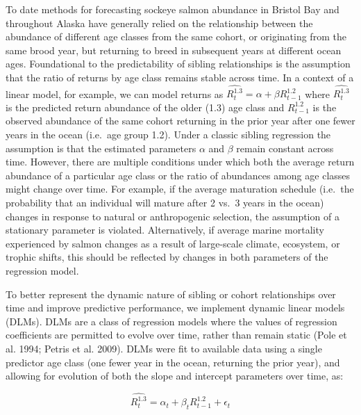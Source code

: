 \documentclass[
]{article}
\begin{document}
To date methods for forecasting sockeye salmon abundance in Bristol Bay and throughout Alaska have generally relied on the relationship between the abundance of different age classes from the same cohort, or originating from the same brood year, but returning to breed in subsequent years at different ocean ages. Foundational to the predictability of sibling relationships is the assumption that the ratio of returns by age class remains stable across time. In a context of a linear model, for example, we can model returns as \(\hat{R^{1.3}_t} = \alpha + \beta{R^{1.2}_{t-1}}\) where \(\hat{R^{1.3}_t}\) is the predicted return abundance of the older (1.3) age class and \(R^{1.2}_{t-1}\) is the observed abundance of the same cohort returning in the prior year after one fewer years in the ocean (i.e.~age group 1.2). Under a classic sibling regression the assumption is that the estimated parameters \(\alpha\) and \(\beta\) remain constant across time. However, there are multiple conditions under which both the average return abundance of a particular age class or the ratio of abundances among age classes might change over time. For example, if the average maturation schedule (i.e.~the probability that an individual will mature after 2 vs.~3 years in the ocean) changes in response to natural or anthropogenic selection, the assumption of a stationary parameter is violated. Alternatively, if average marine mortality experienced by salmon changes as a result of large-scale climate, ecosystem, or trophic shifts, this should be reflected by changes in both parameters of the regression model.

To better represent the dynamic nature of sibling or cohort relationships over time and improve predictive performance, we implement dynamic linear models (DLMs). DLMs are a class of regression models where the values of regression coefficients are permitted to evolve over time, rather than remain static (Pole et al. 1994; Petris et al. 2009). DLMs were fit to available data using a single predictor age class (one fewer year in the ocean, returning the prior year), and allowing for evolution of both the slope and intercept parameters over time, as:

\[\hat{R^{1.3}_t} = \alpha_t + \beta_t{R^{1.2}_{t-1}} + \epsilon_t\]
\end{document}
